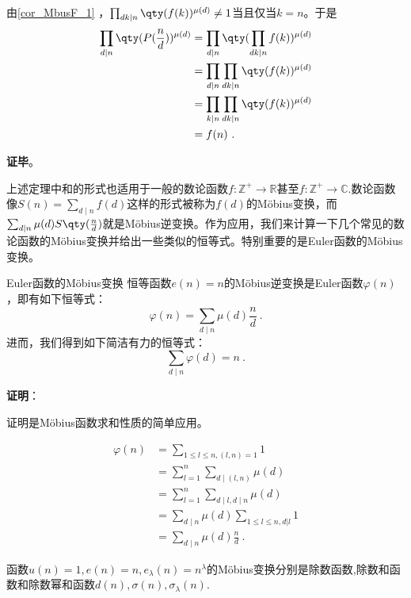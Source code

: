 由\autoref{cor_MbusF_1} ，$\prod_{dk\mid n}\qty(f(k))^{\mu(d)}\neq 1$当且仅当$k=n$。于是
\begin{equation}
\begin{aligned}
\prod_{d\mid n}\qty(P(\frac{n}{d}))^{\mu(d)}&=\prod_{d\mid n}\qty(\prod_{dk\mid n}f(k))^{\mu(d)}\\
&=\prod_{d\mid n}\prod_{dk\mid n}\qty(f(k))^{\mu(d)}\\
&=\prod_{k\mid n}\prod_{dk\mid n}\qty(f(k))^{\mu(d)}\\
&=f(n)~.
\end{aligned}
\end{equation}

\textbf{证毕}。

上述定理中和的形式也适用于一般的数论函数$f:\mathbb{Z}^+\to\mathbb{R}$甚至$f:\mathbb{Z}^+\to\mathbb{C}$.数论函数像$S(n)=\sum_{d\mid n}f(d)$这样的形式被称为$f(d)$的Möbius变换，而$\sum_{d\mid n}\mu(d)S\qty(\frac{n}{d})$就是Möbius逆变换。作为应用，我们来计算一下几个常见的数论函数的Möbius变换并给出一些类似的恒等式。特别重要的是Euler函数的Möbius变换。

\begin{theorem}{Euler函数的Möbius变换}
恒等函数$e(n)=n$的Möbius逆变换是Euler函数$\varphi(n)$，即有如下恒等式：
\begin{equation}
\varphi(n) = \sum_{d\mid n}\mu(d)\frac{n}{d}~.
\end{equation}
进而，我们得到如下简洁有力的恒等式：
\begin{equation}
\sum_{d\mid n}\varphi(d) = n~.
\end{equation}
\end{theorem}

\textbf{证明}：

证明是Möbius函数求和性质的简单应用。

\begin{equation}
\begin{aligned}
\varphi(n)&=\sum_{1\leq l\leq n,(l,n)=1}1\\
&=\sum_{l=1}^n\sum_{d\mid(l,n)}\mu(d)\\
&=\sum_{l=1}^n\sum_{d\mid l,d\mid n}\mu(d)\\
&=\sum_{d\mid n}\mu(d)\sum_{1\leq l\leq n,d|l}1\\
&=\sum_{d\mid n}\mu(d)\frac{n}{d}~.
\end{aligned}
\end{equation}

\begin{theorem}{}
函数$u(n)=1,e(n)=n,e_\lambda(n)=n^\lambda$的Möbius变换分别是除数函数,除数和函数和除数幂和函数$d(n),\sigma(n),\sigma_\lambda(n)$.
\end{theorem}


